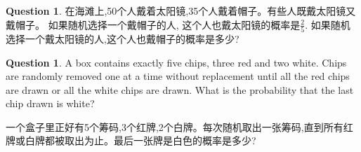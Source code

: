 \documentclass{beamer}
\theoremstyle{definition}
\newtheorem{ques}[defn]{Question}
\begin{document}
\begin{ques}
    在海滩上,50个人戴着太阳镜,35个人戴着帽子。有些人既戴太阳镜又戴帽子。
    如果随机选择一个戴帽子的人,
    这个人也戴太阳镜的概率是$\frac{2}{5}$. 如果随机选择一个戴太阳镜的人,这个人也戴帽子的概率是多少?
\end{ques}
\begin{ques}
    A box contains exactly five chips, three red and two white. Chips are randomly removed one at a time without
    replacement until all the red chips are drawn or all the white chips are drawn. What is the probability that the last chip drawn is white?

    一个盒子里正好有5个筹码,3个红牌,2个白牌。每次随机取出一张筹码,直到所有红牌或白牌都被取出为止。最后一张牌是白色的概率是多少?
\end{ques}
\end{document}
